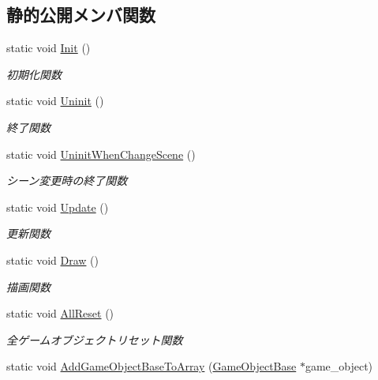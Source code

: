 \subsection*{静的公開メンバ関数}
\begin{DoxyCompactItemize}
\item 
static void \mbox{\hyperlink{class_game_object_manager_abda84aa3b4c79090c43243f93b5a9c46}{Init}} ()
\begin{DoxyCompactList}\small\item\em 初期化関数 \end{DoxyCompactList}\item 
static void \mbox{\hyperlink{class_game_object_manager_a4d2cb0e07fddeea160e64f6e1d2a326a}{Uninit}} ()
\begin{DoxyCompactList}\small\item\em 終了関数 \end{DoxyCompactList}\item 
static void \mbox{\hyperlink{class_game_object_manager_ad962739b2c2f54d4160c3513132930da}{Uninit\+When\+Change\+Scene}} ()
\begin{DoxyCompactList}\small\item\em シーン変更時の終了関数 \end{DoxyCompactList}\item 
static void \mbox{\hyperlink{class_game_object_manager_a6f053b1c655de6ca1c9a8fa9b6e118ae}{Update}} ()
\begin{DoxyCompactList}\small\item\em 更新関数 \end{DoxyCompactList}\item 
static void \mbox{\hyperlink{class_game_object_manager_a0549bd4b6575ee28803c0ff8fd2be2ee}{Draw}} ()
\begin{DoxyCompactList}\small\item\em 描画関数 \end{DoxyCompactList}\item 
static void \mbox{\hyperlink{class_game_object_manager_a38f980aec0970f45eb9bc55db8ac01a3}{All\+Reset}} ()
\begin{DoxyCompactList}\small\item\em 全ゲームオブジェクトリセット関数 \end{DoxyCompactList}\item 
static void \mbox{\hyperlink{class_game_object_manager_ab42e8ca2c7e586d05d513e8a868a86ef}{Add\+Game\+Object\+Base\+To\+Array}} (\mbox{\hyperlink{class_game_object_base}{Game\+Object\+Base}} $\ast$game\+\_\+object)

\end{DoxyCompactItemize}
